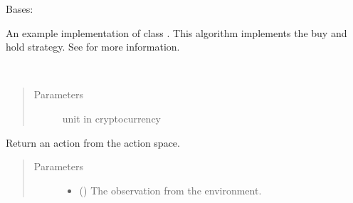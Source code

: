 \documentclass[letterpaper,10pt,english]{sphinxmanual}
\begin{document}

\begin{fulllineitems}
\label{\detokenize{Algorithm:crypto_env.algorithm.BuyAndHold}}
\sphinxAtStartPar
Bases: {\hyperref[\detokenize{Algorithm:crypto_env.algorithm.Algorithm}]{}}

\sphinxAtStartPar
An example implementation of class {\hyperref[\detokenize{Algorithm:crypto_env.algorithm.Algorithm}]{}}. This algorithm implements the buy and hold strategy. See  for more information.

\begin{fulllineitems}
\label{\detokenize{Algorithm:crypto_env.algorithm.BuyAndHold.__init__}}~\begin{quote}\begin{description}
\item[{Parameters}] \leavevmode
\sphinxAtStartPar
{} \textendash{} unit in cryptocurrency

\end{description}\end{quote}

\end{fulllineitems}


\begin{fulllineitems}
\label{\detokenize{Algorithm:crypto_env.algorithm.BuyAndHold.take_action}}
\sphinxAtStartPar
Return an action from the action space.
\begin{quote}\begin{description}
\item[{Parameters}] \leavevmode\begin{itemize}
\item {} 
\sphinxAtStartPar
{} () \textendash{} The observation from the environment.


\end{itemize}
\end{description}
\end{quote}
\end{fulllineitems}
\end{fulllineitems}
\end{document}
